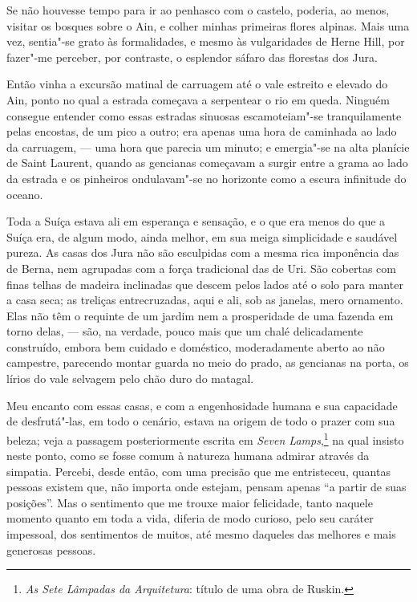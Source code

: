 Se não houvesse tempo para ir ao penhasco com o castelo, poderia, ao
menos, visitar os bosques sobre o Ain, e colher minhas primeiras flores
alpinas. Mais uma vez, sentia"-se grato às formalidades, e mesmo às
vulgaridades de Herne Hill, por fazer"-me perceber, por contraste, o
esplendor sáfaro das florestas dos Jura.

Então vinha a excursão matinal de carruagem até o vale estreito e
elevado do Ain, ponto no qual a estrada começava a serpentear o rio em
queda. Ninguém consegue entender como essas estradas sinuosas
escamoteiam"-se tranquilamente pelas encostas, de um pico a outro; era
apenas uma hora de caminhada ao lado da carruagem, --- uma hora que
parecia um minuto; e emergia"-se na alta planície de Saint Laurent,
quando as gencianas começavam a surgir entre a grama ao lado da estrada
e os pinheiros ondulavam"-se no horizonte como a escura infinitude do
oceano.

Toda a Suíça estava ali em esperança e sensação, e o que era menos
do que a Suíça era, de algum modo, ainda melhor, em sua meiga
simplicidade e saudável pureza. As casas dos Jura não são esculpidas com
a mesma rica imponência das de Berna, nem agrupadas com a força
tradicional das de Uri. São cobertas com finas telhas de madeira
inclinadas que descem pelos lados até o solo para manter a casa seca; as
treliças entrecruzadas, aqui e ali, sob as janelas, mero ornamento. Elas
não têm o requinte de um jardim nem a prosperidade de uma fazenda em
torno delas, --- são, na verdade, pouco mais que um chalé delicadamente
construído, embora bem cuidado e doméstico, moderadamente aberto ao não
campestre, parecendo montar guarda no meio do prado, as gencianas na
porta, os lírios do vale selvagem pelo chão duro do matagal.

Meu encanto com essas casas, e com a engenhosidade humana e sua
capacidade de desfrutá"-las, em todo o cenário, estava na origem de todo
o prazer com sua beleza; veja a passagem posteriormente escrita em
\textit{Seven Lamps},\footnote{\textit{As Sete Lâmpadas da Arquitetura}:
  título de uma obra de Ruskin.} na qual insisto neste
ponto, como se fosse comum à natureza humana admirar através da
simpatia. Percebi, desde então, com uma precisão que me entristeceu,
quantas pessoas existem que, não importa onde estejam, pensam apenas ``a
partir de suas posições''. Mas o sentimento que me trouxe maior
felicidade, tanto naquele momento quanto em toda a vida, diferia de modo
curioso, pelo seu caráter impessoal, dos sentimentos de muitos, até
mesmo daqueles das melhores e mais generosas pessoas.

